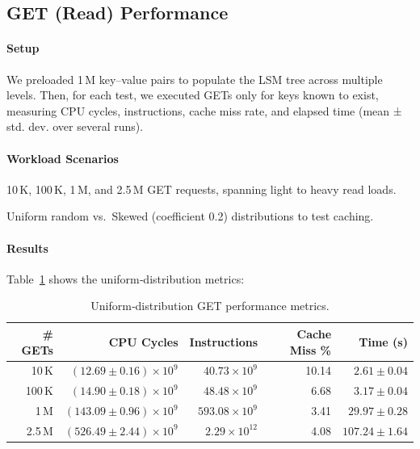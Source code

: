 \documentclass[10pt]{article}
\begin{document}
\subsection{GET (Read) Performance}

\paragraph{Setup}
We preloaded 1\,M key–value pairs to populate the LSM tree across multiple levels. Then, for each test, we executed GETs only for keys known to exist, measuring CPU cycles, instructions, cache miss rate, and elapsed time (mean ± std. dev. over several runs).

\paragraph{Workload Scenarios}
\begin{description}[leftmargin=1em,labelwidth=*,itemsep=0.5ex]
  \item[Query Volume] 10\,K, 100\,K, 1\,M, and 2.5\,M GET requests, spanning light to heavy read loads.
  \item[Access Skew] Uniform random vs.\ Skewed (coefficient 0.2) distributions to test caching.
\end{description}

\paragraph{Results}
Table~\ref{tab:get_read_perf} shows the uniform‐distribution metrics:

\begin{table}[htbp]
  \centering
  \small
  \begin{tabular}{r r r r r}
    \toprule
    \# GETs & CPU Cycles & Instructions & Cache Miss \% & Time (s) \\
    \midrule
    10\,K  & $(12.69\pm0.16)\times10^9$ & $40.73\times10^9$    & 10.14 & $2.61\pm0.04$  \\
    100\,K & $(14.90\pm0.18)\times10^9$ & $48.48\times10^9$    & 6.68  & $3.17\pm0.04$  \\
    1\,M   & $(143.09\pm0.96)\times10^9$& $593.08\times10^9$   & 3.41  & $29.97\pm0.28$ \\
    2.5\,M & $(526.49\pm2.44)\times10^9$& $2.29\times10^{12}$  & 4.08  & $107.24\pm1.64$\\
    \bottomrule
  \end{tabular}
  \caption{Uniform‐distribution GET performance metrics.}
  \label{tab:get_read_perf}
\end{table}
\end{document}
